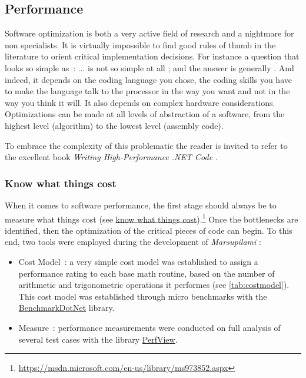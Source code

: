 \subsection{Performance}
Software optimization is both a very active field of research and a nightmare for non specialists. It is virtually impossible to find good rules of thumb in the literature to orient critical implementation decisions. For instance a question that looks so simple as~:  ... is not so simple at all ; and the answer is generally . And indeed, it depends on the coding language you chose, the coding skills you have to make the language talk to the processor in the way you want and not in the way you think it will. It also depends on complex hardware considerations. Optimizations can be made at all levels of abstraction of a software, from the highest level (algorithm) to the lowest level (assembly code).

To embrace the complexity of this problematic the reader is invited to refer to the excellent book \emph{Writing High-Performance .NET Code} \cite{Watson2014}.

\subsubsection{Know what things cost}
When it comes to software performance, the first stage should always be to measure what things cost (see \href{https://msdn.microsoft.com/en-us/library/ms973852.aspx}{know what things cost}).\footnote{\url{https://msdn.microsoft.com/en-us/library/ms973852.aspx}} Once the bottlenecks are identified,
then the optimization of the critical pieces of code can begin. To this end, two tools were employed during the development of \emph{Marsupilami} :
\begin{itemize}
\item Cost Model~: a very simple cost model was established to assign a performance rating to each base math routine, based on the number of arithmetic and trigonometric  operations it performes (see \cref{tab:costmodel}). This cost model was established through micro benchmarks with the \href{https://github.com/Microsoft/perfview}{BenchmarkDotNet} library.
\item Measure~: performance measurements were conducted on full analysis of several test cases with the library \href{https://github.com/Microsoft/perfview}{PerfView}.
\end{itemize}

